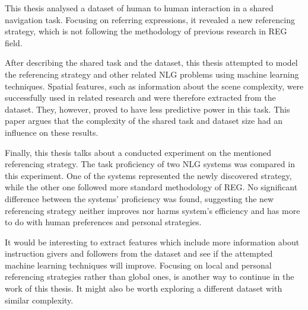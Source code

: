 This thesis analysed a dataset of human to human interaction in a shared navigation task. Focusing on referring expressions, it revealed a new referencing strategy, which is not following the methodology of previous research in REG field. 

After describing the shared task and the dataset, this thesis attempted to model the referencing strategy and other related NLG problems using machine learning techniques. Spatial features, such as information about the scene complexity, were successfully used in related research and were therefore extracted from the dataset. They, however, proved to have less predictive power in this task. This paper argues that the complexity of the shared task and dataset size had an influence on these results.

Finally, this thesis talks about a conducted experiment on the mentioned referencing strategy. The task proficiency of two NLG systems was compared in this experiment. One of the systems represented the newly discovered strategy, while the other one followed more standard methodology of REG. No significant difference between the systems' proficiency was found, suggesting the new referencing strategy neither improves nor harms system's efficiency and has more to do with human preferences and personal strategies.

It would be interesting to extract features which include more information about instruction givers and followers from the dataset and see if the attempted machine learning techniques will improve. Focusing on local and personal referencing strategies rather than global ones, is another way to continue in the work of this thesis. It might also be worth exploring a different dataset with similar complexity.

